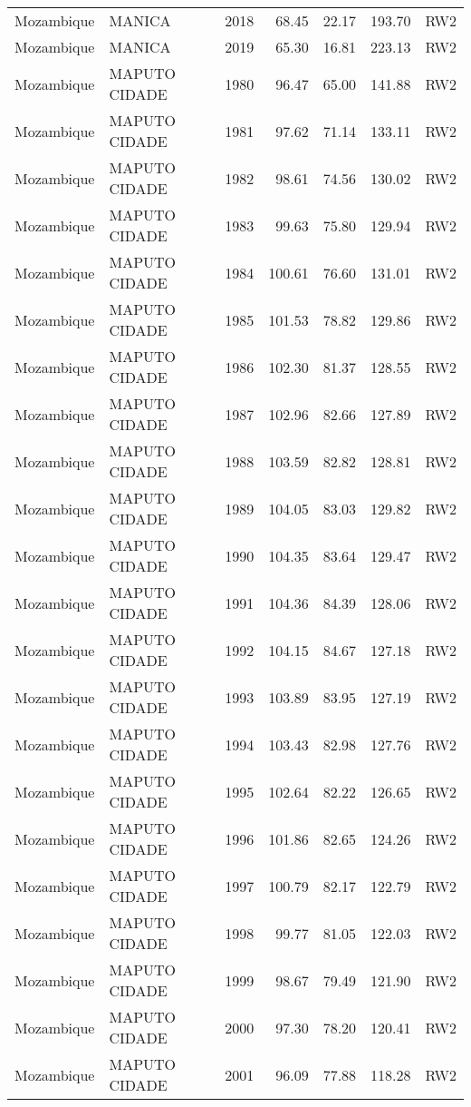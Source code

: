 \begin{longtable}{lllrrrl}
  Mozambique & MANICA & 2018 & 68.45 & 22.17 & 193.70 & RW2 \\ 
  Mozambique & MANICA & 2019 & 65.30 & 16.81 & 223.13 & RW2 \\ 
  Mozambique & MAPUTO CIDADE & 1980 & 96.47 & 65.00 & 141.88 & RW2 \\ 
  Mozambique & MAPUTO CIDADE & 1981 & 97.62 & 71.14 & 133.11 & RW2 \\ 
  Mozambique & MAPUTO CIDADE & 1982 & 98.61 & 74.56 & 130.02 & RW2 \\ 
  Mozambique & MAPUTO CIDADE & 1983 & 99.63 & 75.80 & 129.94 & RW2 \\ 
  Mozambique & MAPUTO CIDADE & 1984 & 100.61 & 76.60 & 131.01 & RW2 \\ 
  Mozambique & MAPUTO CIDADE & 1985 & 101.53 & 78.82 & 129.86 & RW2 \\ 
  Mozambique & MAPUTO CIDADE & 1986 & 102.30 & 81.37 & 128.55 & RW2 \\ 
  Mozambique & MAPUTO CIDADE & 1987 & 102.96 & 82.66 & 127.89 & RW2 \\ 
  Mozambique & MAPUTO CIDADE & 1988 & 103.59 & 82.82 & 128.81 & RW2 \\ 
  Mozambique & MAPUTO CIDADE & 1989 & 104.05 & 83.03 & 129.82 & RW2 \\ 
  Mozambique & MAPUTO CIDADE & 1990 & 104.35 & 83.64 & 129.47 & RW2 \\ 
  Mozambique & MAPUTO CIDADE & 1991 & 104.36 & 84.39 & 128.06 & RW2 \\ 
  Mozambique & MAPUTO CIDADE & 1992 & 104.15 & 84.67 & 127.18 & RW2 \\ 
  Mozambique & MAPUTO CIDADE & 1993 & 103.89 & 83.95 & 127.19 & RW2 \\ 
  Mozambique & MAPUTO CIDADE & 1994 & 103.43 & 82.98 & 127.76 & RW2 \\ 
  Mozambique & MAPUTO CIDADE & 1995 & 102.64 & 82.22 & 126.65 & RW2 \\ 
  Mozambique & MAPUTO CIDADE & 1996 & 101.86 & 82.65 & 124.26 & RW2 \\ 
  Mozambique & MAPUTO CIDADE & 1997 & 100.79 & 82.17 & 122.79 & RW2 \\ 
  Mozambique & MAPUTO CIDADE & 1998 & 99.77 & 81.05 & 122.03 & RW2 \\ 
  Mozambique & MAPUTO CIDADE & 1999 & 98.67 & 79.49 & 121.90 & RW2 \\ 
  Mozambique & MAPUTO CIDADE & 2000 & 97.30 & 78.20 & 120.41 & RW2 \\ 
  Mozambique & MAPUTO CIDADE & 2001 & 96.09 & 77.88 & 118.28 & RW2 \\ 

\end{longtable}
